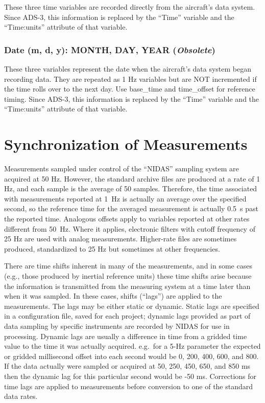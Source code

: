 \documentclass[
  english,
]{book}
\begin{document}
These three time variables are recorded directly from the aircraft's
data system. Since ADS-3, this information is replaced by the ``Time''
variable and the ``Time:units'' attribute of that variable.

\hypertarget{mdy}{%
\subsubsection*{\texorpdfstring{Date (m, d, y): MONTH, DAY, YEAR
(\emph{Obsolete})}{Date (m, d, y): MONTH, DAY, YEAR (Obsolete)}}\label{mdy}}

These three variables represent the date when the aircraft's data system
began recording data. They are repeated as 1 Hz variables but are NOT
incremented if the time rolls over to the next day. Use base\_time and
time\_offset for reference timing. Since ADS-3, this information is
replaced by the ``Time'' variable and the ``Time:units'' attribute of
that variable.

\hypertarget{synchronization-of-measurements}{%
\section{Synchronization of
Measurements}\label{synchronization-of-measurements}}

Measurements sampled under control of the ``NIDAS'' sampling system are
acquired at 50 Hz. However, the standard archive files are produced at a
rate of 1 Hz, and each sample is the average of 50 samples. Therefore,
the time associated with measurements reported at 1~Hz is actually an
average over the specified second, so the reference time for the
averaged measurement is actually 0.5~s past the reported time. Analogous
offsets apply to variables reported at other rates different from 50~Hz.
Where it applies, electronic filters with cutoff frequency of 25 Hz are
used with analog measurements. Higher-rate files are sometimes produced,
standardized to 25 Hz but sometimes at other frequencies.

There are time shifts inherent in many of the measurements, and in some
cases (e.g., those produced by inertial reference units) these time
shifts arise because the information is transmitted from the measuring
system at a time later than when it was sampled. In these cases, shifts
(``lags'') are applied to the measurements. The lags may be either
static or dynamic. Static lags are specified in a configuration file,
saved for each project; dynamic lags provided as part of data sampling
by specific instruments are recorded by NIDAS for use in processing.
Dynamic lags are usually a difference in time from a gridded time value
to the time it was actually acquired. e.g.~for a 5-Hz parameter the
expected or gridded millisecond offset into each second would be 0, 200,
400, 600, and 800. If the data actually were sampled or acquired at 50,
250, 450, 650, and 850 ms then the dynamic lag for this particular
second would be -50 ms. Corrections for time lags are applied to
measurements before conversion to one of the standard data rates.
\end{document}
